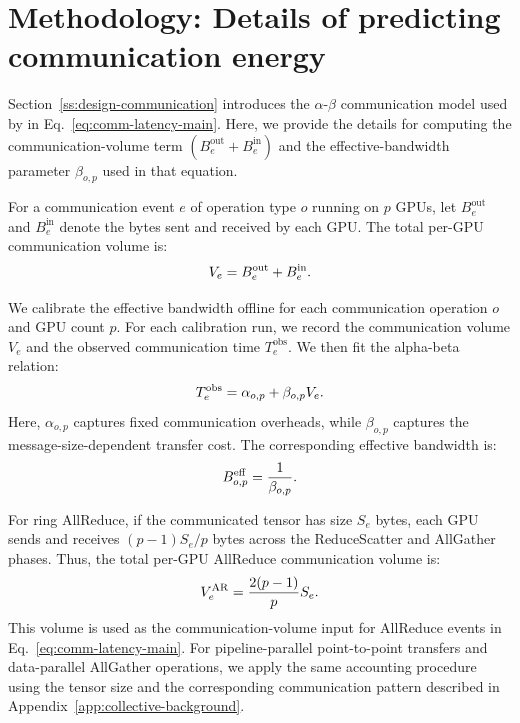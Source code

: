 \section{Methodology: Details of predicting communication energy}
\label{app:alpha-beta-comm}

Section~\ref{ss:design-communication} introduces the $\alpha$-$\beta$ communication model used by \sys{} in Eq.~\ref{eq:comm-latency-main}. 
Here, we provide the details for computing the communication-volume term $\left(B_{e}^{\mathrm{out}} + B_{e}^{\mathrm{in}}\right)$ and the effective-bandwidth parameter $\beta_{o,p}$ used in that equation.

For a communication event $e$ of operation type $o$ running on $p$ GPUs, let $B_{e}^{\mathrm{out}}$ and $B_{e}^{\mathrm{in}}$ denote the bytes sent and received by each GPU. 
The total per-GPU communication volume is:
\vspace{-9pt}
\begin{equation}
\label{eq:comm-volume}
V_e =
B_{e}^{\mathrm{out}} + B_{e}^{\mathrm{in}} .
\vspace{-9pt}
\end{equation}

We calibrate the effective bandwidth offline for each communication operation $o$ and GPU count $p$. 
For each calibration run, we record the communication volume $V_e$ and the observed communication time $T_{e}^{\mathrm{obs}}$. 
We then fit the alpha-beta relation:
\vspace{-9pt}
\begin{equation}
\label{eq:alpha-beta-calibration}
T_{e}^{\mathrm{obs}} =
\alpha_{o,p} +
\beta_{o,p} V_e .
\vspace{-9pt}
\end{equation}
Here, $\alpha_{o,p}$ captures fixed communication overheads, while $\beta_{o,p}$ captures the message-size-dependent transfer cost. 
The corresponding effective bandwidth is:
\vspace{-9pt}
\begin{equation}
\label{eq:effective-bandwidth}
B_{o,p}^{\mathrm{eff}} =
\frac{1}{\beta_{o,p}} .
\vspace{-9pt}
\end{equation}

For ring AllReduce, if the communicated tensor has size $S_e$ bytes, each GPU sends and receives $(p-1)S_e/p$ bytes across the ReduceScatter and AllGather phases. 
Thus, the total per-GPU AllReduce communication volume is:
\vspace{-9pt}
\begin{equation}
\label{eq:allreduce-volume}
V_e^{\mathrm{AR}} =
\frac{2(p-1)}{p}S_e .
\vspace{-9pt}
\end{equation}
This volume is used as the communication-volume input for AllReduce events in Eq.~\ref{eq:comm-latency-main}. 
For pipeline-parallel point-to-point transfers and data-parallel AllGather operations, we apply the same accounting procedure using the tensor size and the corresponding communication pattern described in Appendix~\ref{app:collective-background}.


